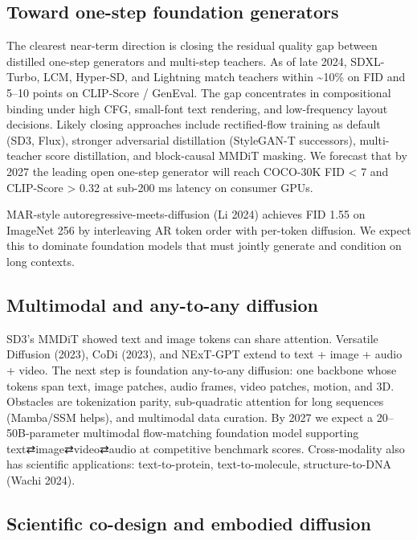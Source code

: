 \documentclass{article}
\begin{document}
\subsection{Toward one-step foundation generators}\label{toward-one-step-foundation-generators}

The clearest near-term direction is closing the residual quality gap between distilled one-step generators and multi-step teachers. As of late 2024, SDXL-Turbo, LCM, Hyper-SD, and Lightning match teachers within \textasciitilde10\% on FID and 5--10 points on CLIP-Score / GenEval. The gap concentrates in compositional binding under high CFG, small-font text rendering, and low-frequency layout decisions. Likely closing approaches include rectified-flow training as default (SD3, Flux), stronger adversarial distillation (StyleGAN-T successors), multi-teacher score distillation, and block-causal MMDiT masking. We forecast that by 2027 the leading open one-step generator will reach COCO-30K FID \textless{} 7 and CLIP-Score \textgreater{} 0.32 at sub-200 ms latency on consumer GPUs.

MAR-style autoregressive-meets-diffusion (Li 2024) achieves FID 1.55 on ImageNet 256 by interleaving AR token order with per-token diffusion. We expect this to dominate foundation models that must jointly generate and condition on long contexts.

\subsection{Multimodal and any-to-any diffusion}\label{multimodal-and-any-to-any-diffusion}

SD3's MMDiT showed text and image tokens can share attention. Versatile Diffusion (2023), CoDi (2023), and NExT-GPT extend to text + image + audio + video. The next step is foundation any-to-any diffusion: one backbone whose tokens span text, image patches, audio frames, video patches, motion, and 3D. Obstacles are tokenization parity, sub-quadratic attention for long sequences (Mamba/SSM helps), and multimodal data curation. By 2027 we expect a 20--50B-parameter multimodal flow-matching foundation model supporting text⇄image⇄video⇄audio at competitive benchmark scores. Cross-modality also has scientific applications: text-to-protein, text-to-molecule, structure-to-DNA (Wachi 2024).

\subsection{Scientific co-design and embodied diffusion}\label{scientific-co-design-and-embodied-diffusion}
\end{document}
